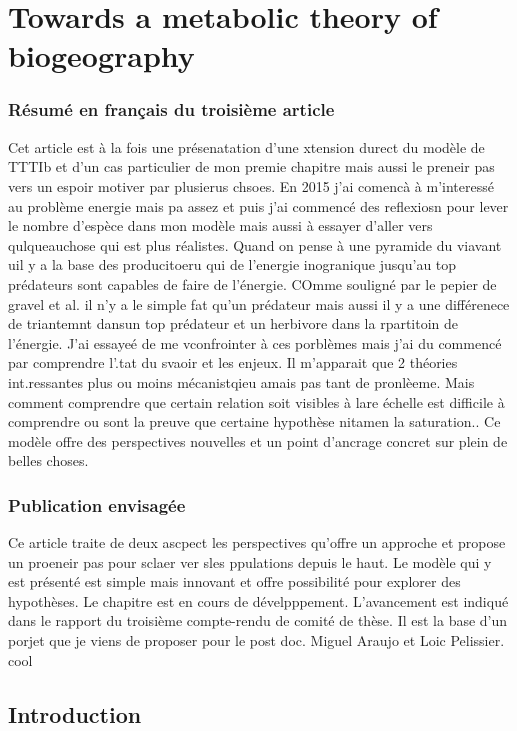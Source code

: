 \chapter{Towards a metabolic theory of biogeography}
\label{chap4}

\subsection{Résumé en français du troisième article}

Cet article est à la fois une présenatation d'une xtension durect du modèle de TTTIb et d'un cas particulier de mon premie chapitre mais aussi
le preneir pas vers un espoir motiver par plusierus chsoes. En 2015 j'ai comencà à m'interessé au problème energie mais pa assez et puis j'ai commencé
des reflexiosn pour lever le nombre d'espèce dans mon modèle mais aussi à essayer d'aller vers qulqueauchose qui est plus réalistes.
Quand on pense à une pyramide du viavant uil y a la base des producitoeru qui de l'energie inogranique jusqu'au top prédateurs sont capables de faire de l'énergie.
COmme souligné par le pepier de gravel et al. il n'y a le simple fat qu'un prédateur mais aussi il y a une différenece de triantemnt dansun top prédateur et un herbivore dans la rpartitoin de l'énergie. J'ai essayeé de me vconfrointer à ces porblèmes mais j'ai du commencé par comprendre l'.tat du svaoir et les enjeux. Il m'apparait que 2 théories int.ressantes plus ou moins mécanistqieu amais pas tant de pronlèeme. Mais comment comprendre que certain relation soit visibles à lare échelle est difficile à comprendre ou sont la preuve que certaine hypothèse nitamen la saturation..
Ce modèle offre des perspectives nouvelles et un point d'ancrage concret sur plein de belles choses.

\subsection{Publication envisagée}

Ce article traite de deux ascpect les perspectives qu'offre un approche et propose un proeneir pas pour sclaer ver sles ppulations depuis le haut.
Le modèle qui y est présenté est simple mais innovant et offre possibilité pour explorer des hypothèses.
Le chapitre est en cours de dévelpppement. L'avancement est indiqué dans le rapport du troisième compte-rendu de comité de thèse.
Il est la base d'un porjet que je viens de proposer pour le post doc.
Miguel Araujo et Loic Pelissier. cool
\section{Introduction}\label{introduction}

